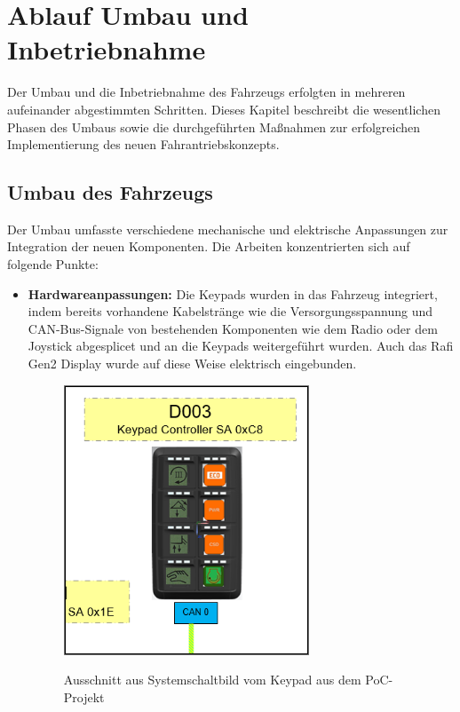 \documentclass[a4paper, 12pt]{article} %
\begin{document}
\section{Ablauf Umbau und Inbetriebnahme}
\begin{spacing}{1.5}
\fontsize{14pt}{14pt}\selectfont

Der Umbau und die Inbetriebnahme des Fahrzeugs erfolgten in mehreren aufeinander abgestimmten Schritten. 
Dieses Kapitel beschreibt die wesentlichen Phasen des Umbaus sowie die durchgeführten 
Maßnahmen zur erfolgreichen Implementierung des neuen Fahrantriebskonzepts.

\subsection{Umbau des Fahrzeugs}
Der Umbau umfasste verschiedene mechanische und elektrische Anpassungen zur Integration der neuen Komponenten. Die Arbeiten konzentrierten sich auf folgende Punkte:

\begin{itemize}
    \item \textbf{Hardwareanpassungen:} Die Keypads wurden in das Fahrzeug integriert, indem bereits vorhandene Kabelstränge wie die Versorgungsspannung und \ac{CAN}-Bus-Signale von bestehenden Komponenten wie dem Radio oder dem Joystick abgesplicet und an die Keypads weitergeführt wurden. Auch das Rafi Gen2 Display wurde auf diese Weise elektrisch eingebunden.
    
    \begin{figure}[H]
        \includegraphics[width=0.4\linewidth]{images/Keypad Foto.png}\\[1ex]
        \centering
        \caption{Ausschnitt aus Systemschaltbild vom Keypad aus dem PoC-Projekt}
        \label{ABBILDUNG}
    \end{figure}


\end{itemize}
\end{spacing}
\end{document}
